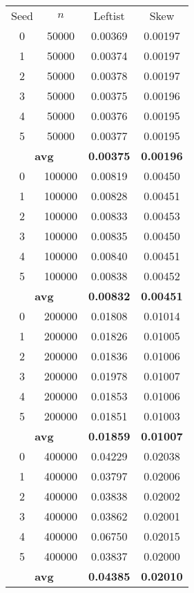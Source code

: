 \documentclass{article}
\begin{document}
\begin{minipage}{0.49\textwidth}
    \begin{center}
        \begin{tabular}{|cccc|}\hline
        Seed & $n$ & Leftist & Skew    \\
        0 & 50000 & 0.00369 & 0.00197 \\
        1 & 50000 & 0.00374 & 0.00197 \\
        2 & 50000 & 0.00378 & 0.00197 \\
        3 & 50000 & 0.00375 & 0.00196 \\
        4 & 50000 & 0.00376 & 0.00195 \\
        5 & 50000 & 0.00377 & 0.00195 \\
        \multicolumn{2}{|c}{\textbf{avg}} & \textbf{0.00375} & \textbf{0.00196} \\ \hline
        0 & 100000 & 0.00819 & 0.00450 \\
        1 & 100000 & 0.00828 & 0.00451 \\
        2 & 100000 & 0.00833 & 0.00453 \\
        3 & 100000 & 0.00835 & 0.00450 \\
        4 & 100000 & 0.00840 & 0.00451 \\
        5 & 100000 & 0.00838 & 0.00452 \\
        \multicolumn{2}{|c}{\textbf{avg}} & \textbf{0.00832} & \textbf{0.00451} \\ \hline
        0 & 200000 & 0.01808 & 0.01014 \\
        1 & 200000 & 0.01826 & 0.01005 \\
        2 & 200000 & 0.01836 & 0.01006 \\
        3 & 200000 & 0.01978 & 0.01007 \\
        4 & 200000 & 0.01853 & 0.01006 \\
        5 & 200000 & 0.01851 & 0.01003 \\
        \multicolumn{2}{|c}{\textbf{avg}} & \textbf{0.01859} & \textbf{0.01007} \\ \hline
        0 & 400000 & 0.04229 & 0.02038 \\
        1 & 400000 & 0.03797 & 0.02006 \\
        2 & 400000 & 0.03838 & 0.02002 \\
        3 & 400000 & 0.03862 & 0.02001 \\
        4 & 400000 & 0.06750 & 0.02015 \\
        5 & 400000 & 0.03837 & 0.02000 \\
        \multicolumn{2}{|c}{\textbf{avg}} & \textbf{0.04385} & \textbf{0.02010} \\ \hline
        \end{tabular}
        \label{tab:ops}
    \end{center}
\end{minipage}
\end{document}
